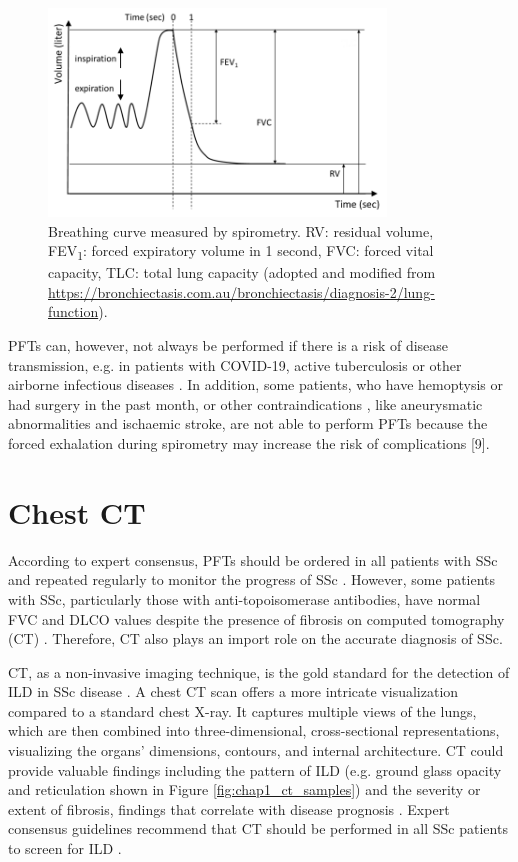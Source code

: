 \begin{figure}[tb]
    \centering
    \includegraphics[width=0.8\textwidth]{Introduction/figures/PFTs.png}
    \caption{Breathing curve measured by spirometry. RV: residual volume, FEV\textsubscript{1}: forced expiratory volume in 1 second, FVC: forced vital capacity, TLC: total lung capacity (adopted and modified from \url{https://bronchiectasis.com.au/bronchiectasis/diagnosis-2/lung-function}).}
    \label{fig:chap1_pft}
\end{figure}



PFTs can, however, not always be performed if there is a risk of disease transmission, e.g. in patients with COVID-19, active tuberculosis or other airborne infectious diseases \cite{choi2022automated, McGowan2022}. In addition, some patients, who have hemoptysis or had surgery in the past month, or other contraindications \cite{Cooper, Meng2023}, like aneurysmatic abnormalities and ischaemic stroke, are not able to perform PFTs because the forced exhalation during spirometry may increase the risk of complications [9].

\section{Chest CT}
According to expert consensus, PFTs should be ordered in all patients with SSc and repeated regularly to monitor the progress of SSc \cite{hoffmann2020identification}. However, some patients with SSc, particularly those with anti-topoisomerase antibodies, have normal FVC and DLCO values despite the presence of fibrosis on computed tomography (CT) \cite{showalter2018performance}. Therefore, CT also plays an import role on the accurate diagnosis of SSc.

CT, as a non-invasive imaging technique, is the gold standard for the detection of ILD in SSc disease \cite{codes2023systemic}. A chest CT scan offers a more intricate visualization compared to a standard chest X-ray. It captures multiple views of the lungs, which are then combined into three-dimensional, cross-sectional representations, visualizing the organs' dimensions, contours, and internal architecture. CT could provide valuable findings including the pattern of ILD (e.g. ground glass opacity and reticulation shown in Figure \ref{fig:chap1_ct_samples}) and the severity or extent of fibrosis, findings that correlate with disease prognosis \cite{silver2015management}. Expert consensus guidelines recommend that CT should be performed in all SSc patients to screen for ILD \cite{hoffmann2020identification}.

